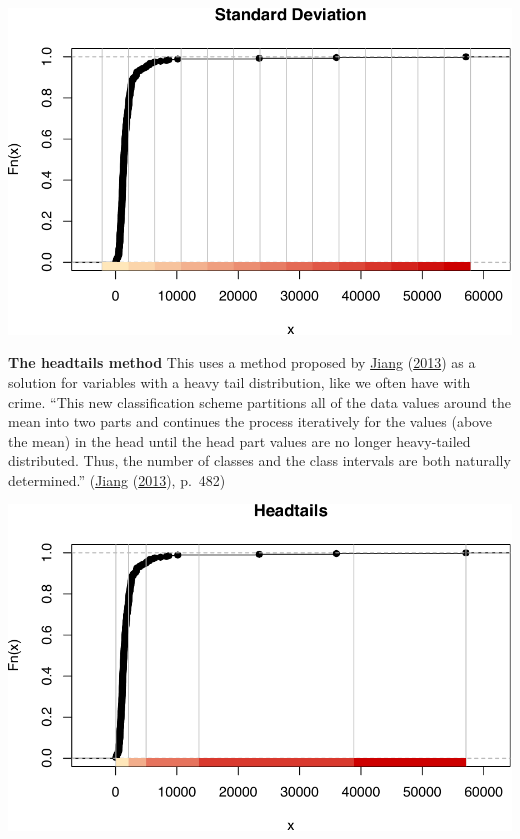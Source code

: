 \documentclass[
]{book}
\newenvironment{Shaded}{\begin{snugshade}}{\end{snugshade}}
\newcommand{\AttributeTok}[1]{\textcolor[rgb]{0.77,0.63,0.00}{#1}}
\newcommand{\FunctionTok}[1]{\textcolor[rgb]{0.00,0.00,0.00}{#1}}
\newcommand{\NormalTok}[1]{#1}
\newcommand{\OtherTok}[1]{\textcolor[rgb]{0.56,0.35,0.01}{#1}}
\newcommand{\SpecialCharTok}[1]{\textcolor[rgb]{0.00,0.00,0.00}{#1}}
\newcommand{\StringTok}[1]{\textcolor[rgb]{0.31,0.60,0.02}{#1}}
\begin{document}
\includegraphics{crime_mapping_files/figure-latex/unnamed-chunk-93-1.pdf}

\textbf{The headtails method} This uses a method proposed by \protect\hyperlink{ref-Jiang_2013}{Jiang} (\protect\hyperlink{ref-Jiang_2013}{2013}) as a solution for variables with a heavy tail distribution, like we often have with crime. ``This new classification scheme partitions all of the data values around the mean into two parts and continues the process iteratively for the values (above the mean) in the head until the head part values are no longer heavy-tailed distributed. Thus, the number of classes and the class intervals are both naturally determined.'' (\protect\hyperlink{ref-Jiang_2013}{Jiang} (\protect\hyperlink{ref-Jiang_2013}{2013}), p.~482)

\begin{Shaded}
\end{Shaded}

\includegraphics{crime_mapping_files/figure-latex/unnamed-chunk-94-1.pdf}
\end{document}
